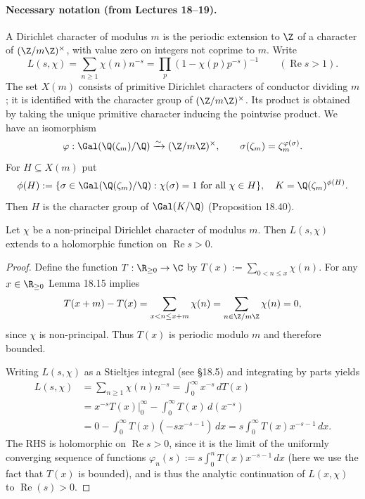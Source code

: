 \paragraph{Necessary notation (from Lectures 18--19).}
A Dirichlet character of modulus $m$ is the periodic extension to $\Z$ of a character of $(\Z/m\Z)^\times$, with value zero on integers not coprime to $m$. Write
\[
L(s,\chi)=\sum_{n\geq1}\chi(n)n^{-s}=\prod_p(1-\chi(p)p^{-s})^{-1}\qquad(\operatorname{Re}s>1).
\]
The set $X(m)$ consists of primitive Dirichlet characters of conductor dividing $m$; it is identified with the character group of $(\Z/m\Z)^\times$. Its product is obtained by taking the unique primitive character inducing the pointwise product. We have an isomorphism
\[
\varphi:\Gal(\Q(\zeta_m)/\Q)\xrightarrow{\sim}(\Z/m\Z)^\times,\qquad \sigma(\zeta_m)=\zeta_m^{\varphi(\sigma)}.
\]
For $H\subseteq X(m)$ put
\[
\phi(H):=\{\sigma\in\Gal(\Q(\zeta_m)/\Q):\chi(\sigma)=1\text{ for all }\chi\in H\},
\quad K=\Q(\zeta_m)^{\phi(H)}.
\]
Then $H$ is the character group of $\Gal(K/\Q)$ (Proposition 18.40).
\begin{proposition}[18.20]
Let $\chi$ be a non-principal Dirichlet character of modulus $m$. Then $L(s,\chi)$ extends to a holomorphic function on $\operatorname{Re}s>0$.
\end{proposition}
\begin{proof}
Define the function $T:\R_{\geq0}\to\C$ by $T(x):=\sum_{0<n\leq x}\chi(n)$. For any $x\in\R_{\geq0}$ Lemma 18.15 implies
\[
T(x+m)-T(x)=\sum_{x<n\leq x+m}\chi(n)=\sum_{n\in\Z/m\Z}\chi(n)=0,
\]
since $\chi$ is non-principal. Thus $T(x)$ is periodic modulo $m$ and therefore bounded.

Writing $L(s,\chi)$ as a Stieltjes integral (see \S18.5) and integrating by parts yields
\begin{align*}
L(s,\chi)&=\sum_{n\geq1}\chi(n)n^{-s}=\int_0^\infty x^{-s}\,dT(x)\\
&=\left.x^{-s}T(x)\right|_0^\infty-\int_0^\infty T(x)\,d(x^{-s})\\
&=0-\int_0^\infty T(x)(-sx^{-s-1})\,dx
=s\int_0^\infty T(x)x^{-s-1}\,dx.
\end{align*}
The RHS is holomorphic on $\operatorname{Re}s>0$, since it is the limit of the uniformly converging sequence of functions $\varphi_n(s):=s\int_0^nT(x)x^{-s-1}\,dx$ (here we use the fact that $T(x)$ is bounded), and is thus the analytic continuation of $L(x,\chi)$ to $\operatorname{Re}(s)>0$.
\end{proof}
